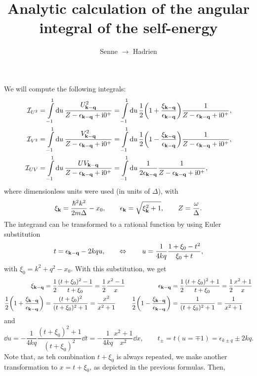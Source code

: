 \documentclass[10pt,a4paper]{article}
\title{Analytic calculation of the angular integral of the self-energy}
\author{Senne $\to$ Hadrien}
\newcommand{\ii}{\ensuremath{\mathrm{i}}}
\newcommand{\xik}{\ensuremath{\xi_{\vb{k}}}}
\newcommand{\xikq}{\ensuremath{\xi_{\vb{k}-\vb{q}}}}
\newcommand{\epsk}{\ensuremath{\epsilon_{\vb{k}}}}
\newcommand{\epskq}{\ensuremath{\epsilon_{\vb{k}-\vb{q}}}}
\begin{document}
\maketitle

We will compute the following integrals:
\begin{align}
    \mathcal{I}_{U^2} &= \int\limits_{-1}^{1} \dd{u}
        \frac{U_{\vb{k}-\vb{q}}^2}{Z-\epskq + \ii 0^+}
    =\int\limits_{-1}^{1} \dd{u} 
        \frac{1}{2} \qty(1+\frac{\xikq}{\epskq}) \frac{1}{Z-\epskq + \ii 0^+}, \\
    \mathcal{I}_{V^2} &= \int\limits_{-1}^{1} \dd{u}
        \frac{V_{\vb{k}-\vb{q}}^2}{Z-\epskq + \ii 0^+}
    =\int\limits_{-1}^{1} \dd{u} 
        \frac{1}{2} \qty(1-\frac{\xikq}{\epskq}) \frac{1}{Z-\epskq + \ii 0^+}, \\
    \mathcal{I}_{UV} &= \int\limits_{-1}^{1} \dd{u}
        \frac{UV_{\vb{k}-\vb{q}}}{Z-\epskq + \ii 0^+}
    =\int\limits_{-1}^{1} \dd{u} 
        \frac{1}{2 \epskq} \frac{1}{Z-\epskq + \ii 0^+},
\end{align}
where dimensionless units were used (in units of $\Delta$), with
\begin{align}
    \xik = \frac{\hbar^2 k^2}{2m\Delta} - x_0, \qquad
    \epsk= \sqrt{\xik^2+1}, \qquad
    Z = \frac{\omega}{\Delta}.
\end{align}
The integrand can be transformed to a rational function by using Euler substitution
\begin{equation}
    t = \epskq - 2 k q u, \qquad \Leftrightarrow \qquad 
    u = \frac{1}{4kq} \frac{1+\xi_0-t^2}{\xi_0+t},
\end{equation}
with $\xi_0 = k^2+q^2-x_0$. With this substitution, we get
\begin{align}
    \xikq  &= \frac{1}{2} \frac{(t+\xi_0)^2-1}{t+\xi_0} = \frac{1}{2} \frac{x^2-1}{x} & 
    \epskq &= \frac{1}{2} \frac{(t+\xi_0)^2+1}{t+\xi_0} = \frac{1}{2} \frac{x^2+1}{x} \\
    \frac{1}{2} \qty(1+\frac{\xikq}{\epskq}) &= \frac{(t+\xi_0)^2}{(t+\xi_0)^2+1} 
        = \frac{x^2}{x^2+1} & 
    \frac{1}{2} \qty(1-\frac{\xikq}{\epskq}) &= \frac{1}{(t+\xi_0)^2+1} = \frac{1}{x^2+1}
\end{align}
and
\begin{equation}
    \dd{u} = -\frac{1}{4kq} \frac{(t+\xi_0)^2+1}{(t+\xi_0)^2} \dd{t} 
    = -\frac{1}{4kq} \frac{x^2+1}{x^2} \dd{x}, \qquad
    t_\pm = t(u=\mp 1) = \epsilon_{k\pm q}\pm 2kq.
\end{equation}
Note that, as teh combination $t+\xi_0$ is always repeated, we make another transformation to $x=t+\xi_0$, as depicted in the previous formulas. Then,
\end{document}
